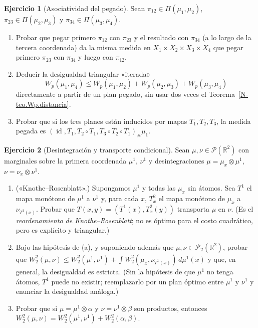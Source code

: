 \documentclass[11pt,a4paper]{amsart}
\newcounter{chapter}
\newcommand{\id}{\operatorname{id}}
\newcommand{\R}{{\mathbb R}}
\theoremstyle{remark}
\theoremstyle{definition}
\newtheorem{ejercicio}{Ejercicio}[chapter]
\numberwithin{subsection}{section}
\numberwithin{equation}{section}
\begin{document}
\begin{ejercicio}[Asociatividad del pegado]\label{ejer.pegado.asociativo}
Sean $\pi_{12}\in\Pi(\mu_1,\mu_2)$, $\pi_{23}\in\Pi(\mu_2,\mu_3)$ y
$\pi_{34}\in\Pi(\mu_3,\mu_4)$.
\begin{enumerate}[label=(\alph*)]
\item Probar que pegar primero $\pi_{12}$ con $\pi_{23}$ y el resultado con
$\pi_{34}$ (a lo largo de la tercera coordenada) da la misma medida en
$X_1\times X_2\times X_3\times X_4$ que pegar primero $\pi_{23}$ con
$\pi_{34}$ y luego con $\pi_{12}$.
\item Deducir la desigualdad triangular «iterada»
\[
W_p(\mu_1,\mu_4)\le W_p(\mu_1,\mu_2)+W_p(\mu_2,\mu_3)+W_p(\mu_3,\mu_4)
\]
directamente a partir de un plan pegado, sin usar dos veces el
Teorema~\ref{N-teo.Wp.distancia}.
\item Probar que si los tres planes están inducidos por mapas $T_1,T_2,T_3$,
la medida pegada es $(\id,T_1,T_2\circ T_1,T_3\circ T_2\circ T_1)_\#\mu_1$.
\end{enumerate}
\end{ejercicio}

\begin{ejercicio}[Desintegración y transporte condicional]\label{ejer.desint.condicional}
Sean $\mu,\nu\in\mathcal P(\R^2)$ con marginales sobre la primera coordenada
$\mu^1$, $\nu^1$ y desintegraciones $\mu=\mu_x\otimes\mu^1$, $\nu=\nu_x\otimes\nu^1$.
\begin{enumerate}[label=(\alph*)]
\item («Knothe--Rosenblatt».) Supongamos $\mu^1$ y todas las $\mu_x$ sin
átomos. Sea $T^1$ el mapa monótono de $\mu^1$ a $\nu^1$ y, para cada $x$,
$T^2_x$ el mapa monótono de $\mu_x$ a $\nu_{T^1(x)}$. Probar que
$T(x,y)=(T^1(x),T^2_x(y))$ transporta $\mu$ en $\nu$. (Es el
\emph{reordenamiento de Knothe--Rosenblatt}; no es óptimo para el costo
cuadrático, pero es explícito y triangular.)
\item Bajo las hipótesis de (a), y suponiendo además que $\mu,\nu\in\mathcal P_2(\R^2)$,
probar que $W_2^2(\mu,\nu)\le W_2^2(\mu^1,\nu^1)+\int W_2^2(\mu_x,\nu_{T^1(x)})\,d\mu^1(x)$
y que, en general, la desigualdad es estricta. (Sin la hipótesis de que
$\mu^1$ no tenga átomos, $T^1$ puede no existir; reemplazarlo por un plan
óptimo entre $\mu^1$ y $\nu^1$ y enunciar la desigualdad análoga.)
\item Probar que si $\mu=\mu^1\otimes\alpha$ y $\nu=\nu^1\otimes\beta$ son
productos, entonces $W_2^2(\mu,\nu)=W_2^2(\mu^1,\nu^1)+W_2^2(\alpha,\beta)$.
\end{enumerate}
\end{ejercicio}
\end{document}
